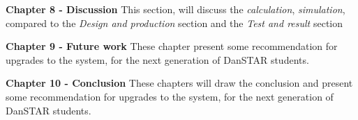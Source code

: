 \textbf{Chapter 8 - Discussion}
This section, will discuss the \textit{calculation}, \textit{simulation}, compared to the \textit{Design and production} section and the \textit{Test and result} section

\textbf{Chapter 9 - Future work}
These chapter present some recommendation for upgrades to the system, for the next generation of DanSTAR students.

\textbf{Chapter 10 - Conclusion}
These chapters will draw the conclusion and present some recommendation for upgrades to the system, for the next generation of DanSTAR students.




